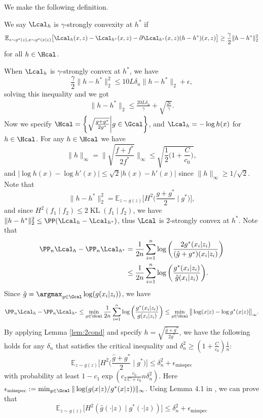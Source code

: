 \documentclass[12pt]{extarticle} %
\newcommand{\misp}{\epsilon_{\text{misspec}}}
\newcommand{\E}{\mathbb{E}}
\begin{document}
We make the following definition. \begin{definition}\label{def:strong-convexity}
        We say $\Lcal_h$ is $\gamma$-strongly convexity at $h^*$ if $$
\E_{z\sim g^*(z), x\sim g^*(x\mid z)}\big[\Lcal_h(x,z) - \Lcal_{h^*}(x,z) - \partial\Lcal_{h^*}(x,z) (h - h^*)(x,z) \big] \geq \frac{\gamma}{2} \|h - h^*\|^2_2
$$ for all $h\in\Hcal$.
\end{definition} 
When $\Lcal_h$ is $\gamma$-strongly convex at $h^*$, we have $$
\frac{\gamma}{2} \| h - h^*\|_2^2 \leq 10L \delta_n \|h - h^*\|_2 + \epsilon,
$$
solving this inequality and we got \begin{align}\label{eq:diff}
\| h - h^* \|_2 \leq \frac{20L\delta_n}{\gamma} + \sqrt{\frac{2 \epsilon}{\gamma}}.
\end{align}
Now we specify $\Hcal = \bigg\{ \sqrt{\frac{g+ g^*}{2g^*}}\biggl\vert g\in \Gcal \bigg\}$, and $\Lcal_h = -\log h(x)$ for $h\in \Hcal$. For any $h\in\Hcal$ we have $$
\|h\|_\infty = \bigg\|\sqrt{\frac{f + f^*}{ 2f^*}}\bigg\|_\infty \leq \sqrt{\frac{1}{2}\bigg(1+ \frac{C}{c_0}\bigg)},
$$
and $|\log h (x) - \log h'(x)|\leq \sqrt{2}|h(x) - h'(x)|$ since $\|h\|_\infty \geq 1/\sqrt{2}$. Note that $$
\| h - h^*\|_2^2 = \E_{z\sim g(z)}\bigg[H^2\bigg(\frac{g+ g^*}{2}\mid g^*\bigg)\bigg],
$$
and since $H^2(f_1\mid f_2) \leq 2 \operatorname{KL}(f_1\mid f_2)$, we have $\|h- h^*\|_2^2 \leq \PP(\Lcal_h - \Lcal_{h^*})$, thus $\Lcal$ is $2$-strongly convex at $h^*$. Note that \begin{align*}
\PP_n \Lcal_h - \PP_n \Lcal_{h^*} &= \frac{1}{2n} \sum_{i=1}^n\log\bigg(\frac{2g^*(x_i|z_i)}{(\hat{g}+g^*)(x_i|z_i)}\bigg)\\
&\leq \frac{1}{2n}\sum_{i=1}^n\log\bigg(\frac{g^*(x_i|z_i)}{\hat{g}(x_i|z_i)}\bigg).
\end{align*}
Since $\hat{g} = \argmax_{g\in\Gcal} \log(g(x_i|z_i))$, we have  $$
\PP_n \Lcal_h - \PP_n \Lcal_{h^*} \leq \min_{g\in \Gcal}\frac{1}{2n}\sum_{i=1}^n\log\bigg(\frac{g^*(x_i|z_i)}{{g}(x_i|z_i)}\bigg)\leq \min_{g\in\Gcal}\big\|\log(x|z) - \log g^*(x|z)\big\|_\infty.
$$
By applying Lemma \ref{lem:2cond} and specify $h = \sqrt{\frac{ \hat{g}+ g^*}{2g^*}}$, we have the following holds for any $\delta_n$ that satisfies the critical inequality and $\delta_n^2\geq (1+\frac{C}{c_0})\frac{1}{n}$: $$
\E_{z\sim g(z)}\bigg[H^2\bigg(\frac{\hat{g}+ g^*}{2}\mid g^*\bigg)\bigg] \leq \delta_n^2 + \misp
$$
with probability at least $1 - c_1\exp(c_2 \frac{c_0}{C+c_0}n\delta_n^2)$. Here $\misp := \min_{g\in\Gcal}\|\log(g(x|z)/g^*(x|z))\|_\infty$.
Using Lemma 4.1 in \cite{van1993hellinger}, we can prove that $$
\E_{z\sim g(z)}\bigg[H^2(\hat{g}(\cdot|z)\mid g^*(\cdot|z))\bigg] \leq \delta_n^2 + \misp
$$
\end{document}
